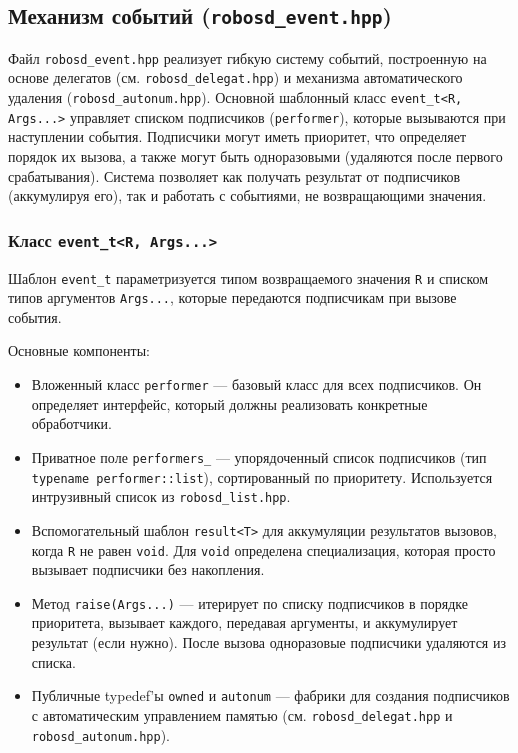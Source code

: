 \documentclass[a4paper,12pt]{article}
\begin{document}
\subsection{Механизм событий (\texttt{robosd\_event.hpp})}

Файл \texttt{robosd\_event.hpp} реализует гибкую систему событий, построенную на основе делегатов (см. \texttt{robosd\_delegat.hpp}) и механизма автоматического удаления (\texttt{robosd\_autonum.hpp}). Основной шаблонный класс \texttt{event\_t<R, Args...>} управляет списком подписчиков (\texttt{performer}), которые вызываются при наступлении события. Подписчики могут иметь приоритет, что определяет порядок их вызова, а также могут быть одноразовыми (удаляются после первого срабатывания). Система позволяет как получать результат от подписчиков (аккумулируя его), так и работать с событиями, не возвращающими значения.

\subsubsection{Класс \texttt{event\_t<R, Args...>}}

Шаблон \texttt{event\_t} параметризуется типом возвращаемого значения \texttt{R} и списком типов аргументов \texttt{Args...}, которые передаются подписчикам при вызове события.

Основные компоненты:

\begin{itemize}
    \item Вложенный класс \texttt{performer} — базовый класс для всех подписчиков. Он определяет интерфейс, который должны реализовать конкретные обработчики.
    \item Приватное поле \texttt{performers\_} — упорядоченный список подписчиков (тип \texttt{typename performer::list}), сортированный по приоритету. Используется интрузивный список из \texttt{robosd\_list.hpp}.
    \item Вспомогательный шаблон \texttt{result<T>} для аккумуляции результатов вызовов, когда \texttt{R} не равен \texttt{void}. Для \texttt{void} определена специализация, которая просто вызывает подписчики без накопления.
    \item Метод \texttt{raise(Args...)} — итерирует по списку подписчиков в порядке приоритета, вызывает каждого, передавая аргументы, и аккумулирует результат (если нужно). После вызова одноразовые подписчики удаляются из списка.
    \item Публичные typedef'ы \texttt{owned} и \texttt{autonum} — фабрики для создания подписчиков с автоматическим управлением памятью (см. \texttt{robosd\_delegat.hpp} и \texttt{robosd\_autonum.hpp}).
\end{itemize}
\end{document}
